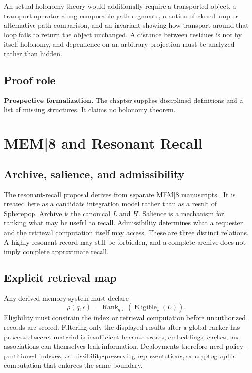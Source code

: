 \documentclass[11pt,openany]{book}
\begin{document}
An actual holonomy theory would additionally require a transported object, a
transport operator along composable path segments, a notion of closed loop or
alternative-path comparison, and an invariant showing how transport around
that loop fails to return the object unchanged. A distance between residues is
not by itself holonomy, and dependence on an arbitrary projection must be
analyzed rather than hidden.

\section{Proof role}
\textbf{Prospective formalization.} The chapter supplies disciplined
definitions and a list of missing structures. It claims no holonomy theorem.

\chapter{MEM|8 and Resonant Recall}
\section{Archive, salience, and admissibility}
The resonant-recall proposal derives from separate MEM|8 manuscripts
\cite{flyxion-wave-machine,flyxion-conscious-gaia}. It is treated here as a
candidate integration model rather than as a result of Spherepop.
Archive is the canonical \(L\) and \(H\). Salience is a mechanism for ranking
what may be useful to recall. Admissibility determines what a requester and
the retrieval computation itself may access. These are three distinct
relations. A highly resonant record may still be forbidden, and a complete
archive does not imply complete approximate recall.

\section{Explicit retrieval map}
Any derived memory system must declare
\[
 \rho(q,c)=\operatorname{Rank}_{q,c}
             (\operatorname{Eligible}_{c}(L)).
\]
Eligibility must constrain the index or retrieval computation before
unauthorized records are scored. Filtering only the displayed results after a
global ranker has processed secret material is insufficient because scores,
embeddings, caches, and associations can themselves leak information.
Deployments therefore need policy-partitioned indexes, admissibility-preserving
representations, or cryptographic computation that enforces the same boundary.
\end{document}
